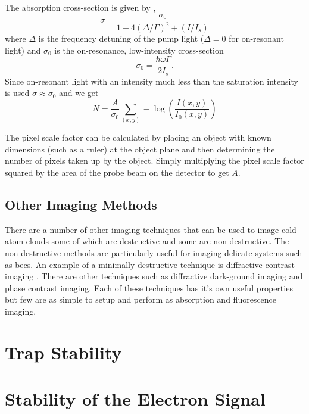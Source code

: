 The absorption cross-section is given by \cite{steck_rubidium_2001},
\begin{equation}\label{eq:cross_section}
\sigma = \frac{\sigma_0}{1+4(\Delta/\Gamma)^2 + (I/I_s)}
\end{equation}
where $\Delta$ is the frequency detuning of the pump light ($\Delta=0$ for on-resonant light) and $\sigma_0$ is the on-resonance, low-intensity  cross-section
\begin{equation}
\sigma_0 = \frac{\hbar\omega\Gamma}{2I_s}.
\end{equation}
Since on-resonant light with an intensity much less than the saturation intensity is used $\sigma \approx \sigma_0$ and we get
\begin{equation}
N = \frac{A}{\sigma_0} \sum_{(x, y)} -\log\left(\frac{I(x, y)}{I_0(x, y)}\right)
\end{equation}

The pixel scale factor can be calculated by placing an object with known dimensions (such as a ruler) at the object plane and then determining the number of pixels taken up by the object. Simply multiplying the pixel scale factor squared by the area of the probe beam on the detector to get $A$.

\subsection{Other Imaging Methods}

There are a number of other imaging techniques that can be used to image cold-atom clouds some of which are destructive and some are non-destructive. The non-destructive methods are particularly useful for imaging delicate systems such as \glspl{bec}. An example of a minimally destructive technique is diffractive contrast imaging \cite{sheludko_excited-state_2007}. There are other techniques such as diffractive dark-ground imaging\cite{gregory-orfeus_diffractive_2011} and phase contrast imaging\cite{andrews_propagation_1997}. Each of these techniques has it's own useful properties but few are as simple to setup and perform as absorption and fluorescence imaging.


\section{Trap Stability}

\section{Stability of the Electron Signal}


